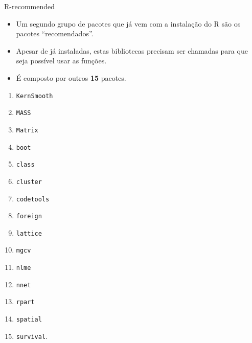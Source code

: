 \documentclass[
  ignorenonframetext,
  serif,
  professionalfont,
  usenames,
  dvipsnames,
  aspectratio = 169]{beamer}
\providecommand{\tightlist}{%
  \setlength{\itemsep}{0pt}\setlength{\parskip}{0pt}}
\renewcommand{\tightlist}{%
  \setlength{\itemsep}{0\baselineskip}
  \setlength{\parskip}{0.25\baselineskip}
}
\def\beginAHalfColumn{\begin{minipage}{0.49\textwidth}}%
\def\endColumns{\end{minipage}}%
\begin{document}
\begin{frame}[fragile]{R-recommended}
\protect\hypertarget{r-recommended}{}
\begin{itemize}
\item
  Um segundo grupo de pacotes que já vem com a instalação do R são os
  pacotes ``recomendados''.
\item
  Apesar de já instaladas, estas bibliotecas precisam ser chamadas para
  que seja possível usar as funções.
\item
  É composto por outros \textbf{15} pacotes.
\end{itemize}

\beginAHalfColumn

\begin{enumerate}
\tightlist
\item
  \texttt{KernSmooth}
\item
  \texttt{MASS}
\item
  \texttt{Matrix}
\item
  \texttt{boot}
\item
  \texttt{class}
\item
  \texttt{cluster}
\item
  \texttt{codetools}
\item
  \texttt{foreign}
\end{enumerate}

\endColumns
\beginAHalfColumn

\begin{enumerate}
\setcounter{enumi}{8}
\tightlist
\item
  \texttt{lattice}
\item
  \texttt{mgcv}
\item
  \texttt{nlme}
\item
  \texttt{nnet}
\item
  \texttt{rpart}
\item
  \texttt{spatial}
\item
  \texttt{survival}.
\end{enumerate}

\endColumns
\end{frame}
\end{document}
